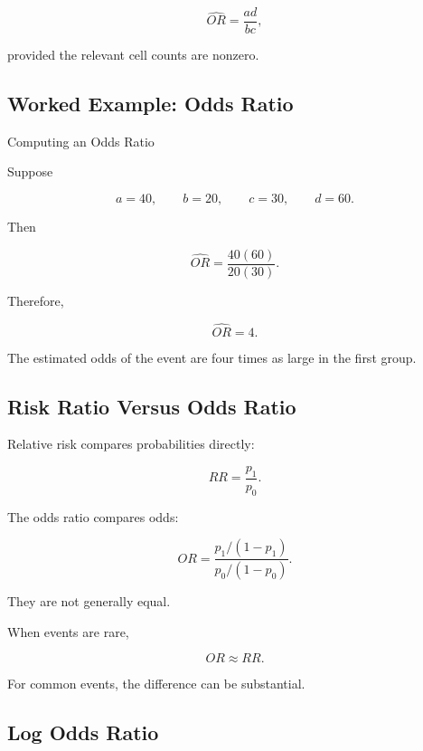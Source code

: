 \[
\boxed{
\widehat{OR}
=
\frac{
ad
}{
bc
},
}
\]

provided the relevant cell counts are nonzero.

\subsection{Worked Example: Odds Ratio}
\label{subsec:worked-odds-ratio}

\begin{workedexamplebox}{Computing an Odds Ratio}

Suppose

\[
a=40,
\qquad
b=20,
\qquad
c=30,
\qquad
d=60.
\]

Then

\[
\widehat{OR}
=
\frac{
40(60)
}{
20(30)
}.
\]

Therefore,

\begin{answerbox}
\[
\boxed{
\widehat{OR}=4.
}
\]
\end{answerbox}

The estimated odds of the event are four times as large in the first
group.

\end{workedexamplebox}

\subsection{Risk Ratio Versus Odds Ratio}
\label{subsec:risk-ratio-versus-odds-ratio}

Relative risk compares probabilities directly:

\[
RR
=
\frac{p_1}{p_0}.
\]

The odds ratio compares odds:

\[
OR
=
\frac{
p_1/(1-p_1)
}{
p_0/(1-p_0)
}.
\]

They are not generally equal.

When events are rare,

\[
\boxed{
OR
\approx
RR.
}
\]

For common events, the difference can be substantial.

\subsection{Log Odds Ratio}
\label{subsec:log-odds-ratio}

